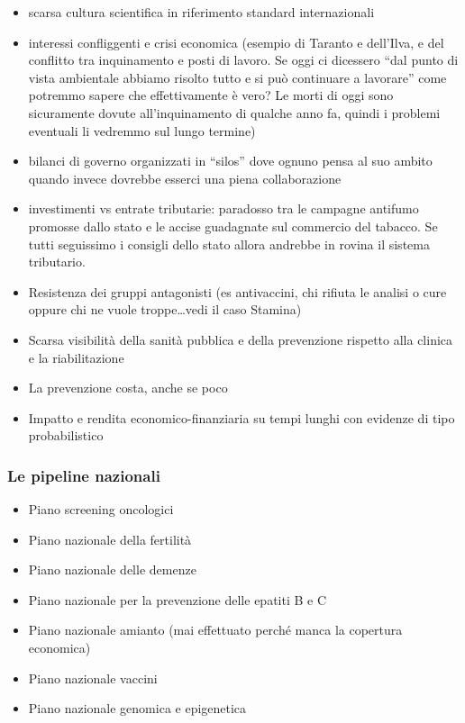 \begin{itemize}
\item
  scarsa cultura scientifica in riferimento standard internazionali
\item
  interessi confliggenti e crisi economica (esempio di Taranto e
  dell'Ilva, e del conflitto tra inquinamento e posti di lavoro. Se oggi
  ci dicessero ``dal punto di vista ambientale abbiamo risolto tutto e
  si può continuare a lavorare'' come potremmo sapere che effettivamente
  è vero? Le morti di oggi sono sicuramente dovute all'inquinamento di
  qualche anno fa, quindi i problemi eventuali li vedremmo sul lungo
  termine)
\item
  bilanci di governo organizzati in ``silos'' dove ognuno pensa al suo
  ambito quando invece dovrebbe esserci una piena collaborazione
\item
  investimenti vs entrate tributarie: paradosso tra le campagne antifumo
  promosse dallo stato e le accise guadagnate sul commercio del tabacco.
  Se tutti seguissimo i consigli dello stato allora andrebbe in rovina
  il sistema tributario.
\item
  Resistenza dei gruppi antagonisti (es antivaccini, chi rifiuta le
  analisi o cure oppure chi ne vuole troppe\ldots{}vedi il caso Stamina)
\item
  Scarsa visibilità della sanità pubblica e della prevenzione rispetto
  alla clinica e la riabilitazione
\item
  La prevenzione costa, anche se poco
\item
  Impatto e rendita economico-finanziaria su tempi lunghi con evidenze
  di tipo probabilistico
\end{itemize}

\subsubsection{Le pipeline nazionali}

\begin{itemize}
\item
  Piano screening oncologici
\item
  Piano nazionale della fertilità
\item
  Piano nazionale delle demenze
\item
  Piano nazionale per la prevenzione delle epatiti B e C
\item
  Piano nazionale amianto (mai effettuato perché manca la copertura
  economica)
\item
  Piano nazionale vaccini
\item
  Piano nazionale genomica e epigenetica
\end{itemize}


